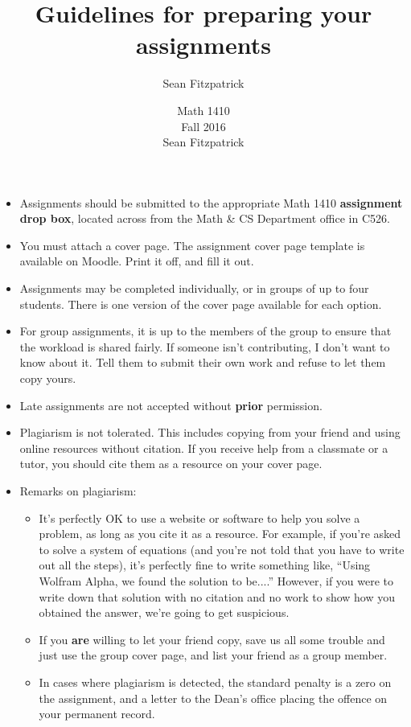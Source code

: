 \documentclass[letterpaper,12pt]{article}
\author{Sean Fitzpatrick}
\title{Guidelines for preparing your assignments}
\author{Math 1410\\Fall 2016\\Sean Fitzpatrick}
\begin{document}
\maketitle

\begin{itemize}
 \item Assignments should be submitted to the appropriate Math 1410 \textbf{assignment drop box}, located across from the Math \& CS Department office in C526.
 \item You must attach a cover page. The assignment cover page template is available on Moodle. Print it off, and fill it out.
 \item Assignments may be completed individually, or in groups of up to four students. There is one version of the cover page available for each option.
 \item For group assignments, it is up to the members of the group to ensure that the workload is shared fairly. If someone isn't contributing, I don't want to know about it. Tell them to submit their own work and refuse to let them copy yours.
 \item Late assignments are not accepted without {\bf prior} permission. 
 \item Plagiarism is not tolerated. This includes copying from your friend and using online resources without citation. If you receive help from a classmate or a tutor, you should cite them as a resource on your cover page.
 \item Remarks on plagiarism:
\begin{itemize}
 \item It's perfectly OK to use a website or software to help you solve a problem, as long as you cite it as a resource. For example, if you're asked to solve a system of equations (and you're not told that you have to write out all the steps), it's perfectly fine to write something like, ``Using Wolfram Alpha, we found the solution to be....'' However, if you were to write down that solution with no citation and no work to show how you obtained the answer, we're going to get suspicious.
 \item If you \textbf{are} willing to let your friend copy, save us all some trouble and just use the group cover page, and list your friend as a group member.
 \item In cases where plagiarism is detected, the standard penalty is a zero on the assignment, and a letter to the Dean's office placing the offence on your permanent record.
\end{itemize}

\end{itemize}
\end{document}
